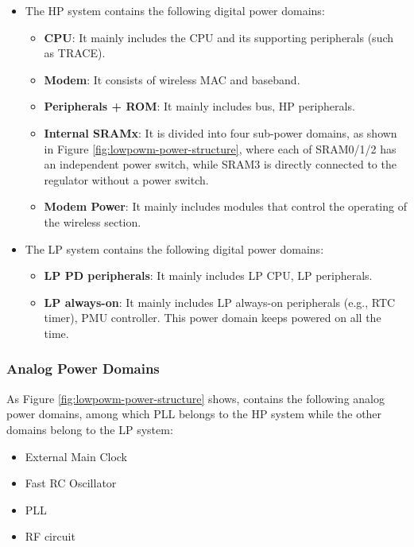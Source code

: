 \documentclass[main\_\_EN.tex]{subfiles}
\begin{document}
\begin{itemize}
    \item The HP system contains the following digital power domains:
    \begin{itemize}
        \item \textbf{CPU}: It mainly includes the CPU and its supporting peripherals (such as TRACE).
        \item \textbf{Modem}: It consists of wireless MAC and baseband.
        \item \textbf{Peripherals + ROM}: It mainly includes bus, HP peripherals.
        \item \textbf{Internal SRAMx}: It is divided into four sub-power domains, as shown in Figure \ref{fig:lowpowm-power-structure}, where each of SRAM0/1/2 has an independent power switch, while SRAM3 is directly connected to the regulator without a power switch.
        \item \textbf{Modem Power}: It mainly includes modules that control the operating of the wireless section.
    \end{itemize}
    \item The LP system contains the following digital power domains:
    \begin{itemize}
        \item \textbf{LP PD peripherals}: It mainly includes LP CPU, LP peripherals.
        \item \textbf{LP always-on}: It mainly includes LP always-on peripherals (e.g., RTC timer), PMU controller. This power domain keeps powered on all the time.
    \end{itemize}
\end{itemize}

\subsubsection{Analog Power Domains}

As Figure \ref{fig:lowpowm-power-structure} shows, \chipname{} contains the following analog power domains, among which PLL belongs to the HP system while the other domains belong to the LP system:

\begin{itemize}
    \item External Main Clock
    \item Fast RC Oscillator
    \item PLL
    \item RF circuit
\end{itemize}
\end{document}
